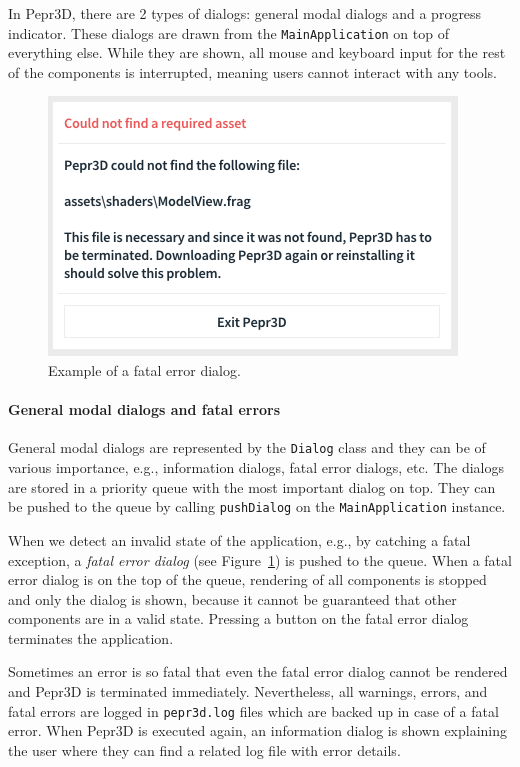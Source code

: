 In Pepr3D, there are 2 types of dialogs: general modal dialogs and a progress indicator.
These dialogs are drawn from the \texttt{MainApplication} on top of everything else.
While they are shown, all mouse and keyboard input for the rest of the components is interrupted, meaning users cannot interact with any tools.

\begin{figure}[h]
	\centering
	\centerline{\includegraphics[scale=1.0]{images/fatal_error.png}}
	\caption{Example of a fatal error dialog.}
	\label{fig:fatalerror}
\end{figure}

\paragraph{General modal dialogs and fatal errors}
General modal dialogs are represented by the \texttt{Dialog} class and they can be of various importance, e.g., information dialogs, fatal error dialogs, etc.
The dialogs are stored in a priority queue with the most important dialog on top.
They can be pushed to the queue by calling \texttt{pushDialog} on the \texttt{MainApplication} instance.

When we detect an invalid state of the application, e.g., by catching a fatal exception, a \emph{fatal error dialog} (see Figure~\ref{fig:fatalerror}) is pushed to the queue.
When a fatal error dialog is on the top of the queue, rendering of all components is stopped and only the dialog is shown, because it cannot be guaranteed that other components are in a valid state.
Pressing a button on the fatal error dialog terminates the application.

Sometimes an error is so fatal that even the fatal error dialog cannot be rendered and Pepr3D is terminated immediately.
Nevertheless, all warnings, errors, and fatal errors are logged in \texttt{pepr3d.log} files which are backed up in case of a fatal error.
When Pepr3D is executed again, an information dialog is shown explaining the user where they can find a related log file with error details.

